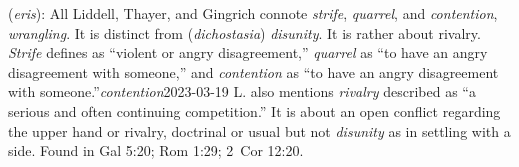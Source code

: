 \item[Quarrel,]

(\textit{eris}):
All Liddell, Thayer, and Gingrich connote \emph{strife}, \emph{quarrel}, and \emph{contention}, \emph{wrangling}. It is  distinct from  (\emph{dichostasia}) \emph{disunity}. It is rather about rivalry. \emph{Strife} defines as ``violent or angry disagreement,'' \emph{quarrel} as ``to have an angry disagreement with someone,'' and \emph{contention} as ``to have an angry disagreement with someone.''\emph{contention}{2023-03-19} L. also mentions \emph{rivalry} described as ``a serious and often continuing competition.'' It is about an open conflict regarding the upper hand or rivalry, doctrinal or usual but not \emph{disunity} as in settling with a side.
Found in Gal 5:20; Rom 1:29; 2~Cor 12:20.
